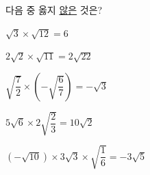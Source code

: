 다음 중 옳지 \underline{않은} 것은?
\begin{choicesii}{\rule[-3ex]{0pt}{8ex}$\sqrt{3}\times\sqrt{12}=6$}{\rule[-3ex]{0pt}{8ex}$2\sqrt{2}\times\sqrt{11}=2\sqrt{22}$}{\rule[-3ex]{0pt}{8ex}$\sqrt{\dfrac{7}{2}}\times\left(-\sqrt{\dfrac{6}{7}}\right)=-\sqrt{3}$}{\rule[-3ex]{0pt}{8ex}$5\sqrt{6}\times 2\sqrt{\dfrac{2}{3}}=10\sqrt{2}$}{\rule[-3ex]{0pt}{8ex}$(-\sqrt{10})\times 3\sqrt{3}\times\sqrt{\dfrac{1}{6}}=-3\sqrt{5}$}\end{choicesii}
